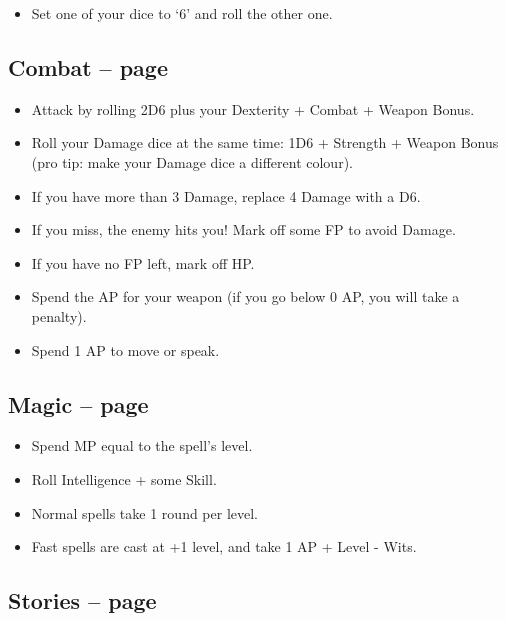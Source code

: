 \begin{multicols}{2}
\begin{itemize}

  \item{Set one of your dice to `6' and roll the other one.}
  
\end{itemize}

\subsection{Combat -- page \pageref{attack}}

\begin{itemize}
  \item
  Attack by rolling 2D6 plus your Dexterity + Combat + Weapon Bonus.
  \item
  Roll your Damage dice at the same time: 1D6 + Strength + Weapon Bonus (pro tip: make your Damage dice a different colour).
  \item
  If you have more than 3 Damage, replace 4 Damage with a D6.
  \item
  If you miss, the enemy hits you!
  Mark off some FP to avoid Damage.
  \item
  If you have no FP left, mark off HP.
  \item
  Spend the AP for your weapon (if you go below 0 AP, you will take a penalty).
  \item
  Spend 1 AP to move or speak.
\end{itemize}

\subsection{Magic -- page \pageref{basiccasting}}

\begin{itemize}

  \item
  Spend MP equal to the spell's level.
  \item
  Roll Intelligence + some Skill.
  \item
  Normal spells take 1 round per level.
  \item
  Fast spells are cast at +1 level, and take 1 AP + Level - Wits.

\end{itemize}

\subsection{Stories -- page \pageref{stories}}


\end{multicols}
